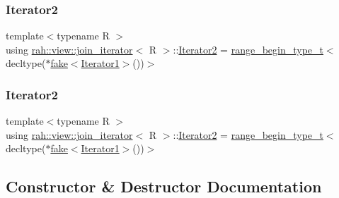 \subsubsection{\texorpdfstring{Iterator2}{Iterator2}\hspace{0.1cm}{\footnotesize\ttfamily [1/2]}}
{\footnotesize\ttfamily template$<$typename R $>$ \\
using \mbox{\hyperlink{structrah_1_1view_1_1join__iterator}{rah\+::view\+::join\+\_\+iterator}}$<$ R $>$\+::\mbox{\hyperlink{structrah_1_1view_1_1join__iterator_ae03a066174f3422c70d0e3c22e68d9f7}{Iterator2}} =  \mbox{\hyperlink{namespacerah_a28aff4eeddcece6be65ff0b956d32d4a}{range\+\_\+begin\+\_\+type\+\_\+t}}$<$decltype($\ast$\mbox{\hyperlink{namespacerah_aa659f5ae02cb923cd8813f96cfd86a25}{fake}}$<$\mbox{\hyperlink{structrah_1_1view_1_1join__iterator_a8b71c6f25eee2915e2a8afc6e024196d}{Iterator1}}$>$())$>$}

\mbox{\label{structrah_1_1view_1_1join__iterator_ae03a066174f3422c70d0e3c22e68d9f7}} 
\subsubsection{\texorpdfstring{Iterator2}{Iterator2}\hspace{0.1cm}{\footnotesize\ttfamily [2/2]}}
{\footnotesize\ttfamily template$<$typename R $>$ \\
using \mbox{\hyperlink{structrah_1_1view_1_1join__iterator}{rah\+::view\+::join\+\_\+iterator}}$<$ R $>$\+::\mbox{\hyperlink{structrah_1_1view_1_1join__iterator_ae03a066174f3422c70d0e3c22e68d9f7}{Iterator2}} =  \mbox{\hyperlink{namespacerah_a28aff4eeddcece6be65ff0b956d32d4a}{range\+\_\+begin\+\_\+type\+\_\+t}}$<$decltype($\ast$\mbox{\hyperlink{namespacerah_aa659f5ae02cb923cd8813f96cfd86a25}{fake}}$<$\mbox{\hyperlink{structrah_1_1view_1_1join__iterator_a8b71c6f25eee2915e2a8afc6e024196d}{Iterator1}}$>$())$>$}



\subsection{Constructor \& Destructor Documentation}
\mbox{\label{structrah_1_1view_1_1join__iterator_a5a30ddd6e3809e32be7d6dc723c4afe5}} 

